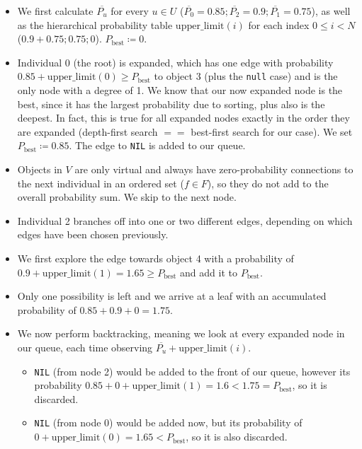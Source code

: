 \documentclass[9pt,lineno]{elife}
\begin{document}
\begin{appendixbox}
\begin{itemize}
    \item We first calculate $\overline{P_u}$ for every $u\in U$ ($\overline{P_0}=0.85; \overline{P_2}=0.9; \overline{P_1}=0.75$), as well as the hierarchical probability table $\mathrm{upper\_limit}(i)$ for each index $0\leq i < N$ ($0.9+0.75; 0.75; 0$). $P_\mathrm{best} \coloneqq 0$.
    \item Individual 0 (the root) is expanded, which has one edge with probability $0.85 + \mathrm{upper\_limit}(0) \geq P_\mathrm{best}$ to object 3 (plus the \texttt{null} case) and is the only node with a degree of 1. We know that our now expanded node is the best, since it has the largest probability due to sorting, plus also is the deepest. In fact, this is true for all expanded nodes exactly in the order they are expanded (depth-first search $==$ best-first search for our case). We set $P_\mathrm{best}\coloneqq 0.85$. The edge to \texttt{NIL} is added to our queue.
    \item Objects in $V$ are only virtual and always have zero-probability connections to the next individual in an ordered set ($f\in F$), so they do not add to the overall probability sum. We skip to the next node.
    \item Individual 2 branches off into one or two different edges, depending on which edges have been chosen previously.
    \item We first explore the edge towards object 4 with a probability of $0.9 + \mathrm{upper\_limit}(1) = 1.65 \geq P_\mathrm{best}$ and add it to $P_\mathrm{best}$.
    \item Only one possibility is left and we arrive at a leaf with an accumulated probability of $0.85+0.9+0=1.75$.
    \item We now perform backtracking, meaning we look at every expanded node in our queue, each time observing $\overline{P_u} + \mathrm{upper\_limit}(i)$. 
    \begin{itemize}
        \item \texttt{NIL} (from node 2) would be added to the front of our queue, however its probability $0.85 + 0 + \mathrm{upper\_limit}(1) = 1.6 < 1.75 = P_\mathrm{best}$, so it is discarded.
        \item \texttt{NIL} (from node 0) would be added now, but its probability of $0 + \mathrm{upper\_limit}(0) = 1.65 < P_\mathrm{best}$, so it is also discarded.
    \end{itemize}
\end{itemize}      


\end{appendixbox}
\end{document}
